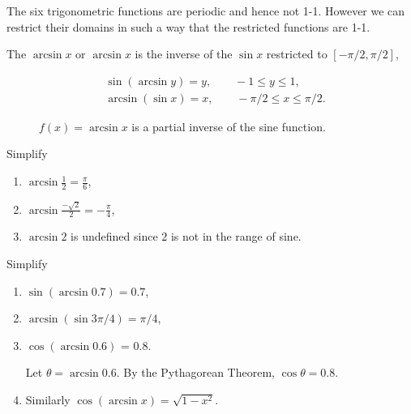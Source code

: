 \documentclass[calc1-main.tex]{subfiles}
\begin{document}
The six trigonometric functions are periodic and hence not 1-1. However we can restrict their domains in such a way that the restricted functions are 1-1.

\begin{minipage}{0.5\textwidth}
  The $\arcsin x$ or $\arcsin x$ is the inverse of the $\sin x$ restricted to $[-\pi/2, \pi/2]$,

  \begin{align*}
    & \sin (\arcsin y) = y, \qquad -1 \le y \le 1, \\
    & \arcsin (\sin x) = x, \qquad -\pi/2 \le x \le \pi/2.
  \end{align*}
\end{minipage}%
\begin{minipage}{0.5\textwidth}
  \begin{figure}[H]
    \centering
    
    \caption{$f(x) = \arcsin x$ is a partial inverse of the sine function.}
  \end{figure}
\end{minipage}

\begin{example}
  Simplify
  \begin{enumerate}
    \item $\arcsin \frac{1}{2} = \frac{\pi}{6}$,

    \item $\arcsin \frac{-\sqrt{2}}{2} = -\frac{\pi}{4}$,

    \item $\arcsin 2$ is undefined since $2$ is not in the range of sine.
  \end{enumerate}
\end{example}

\begin{example}
  Simplify
  \begin{enumerate}
    \item $\sin(\arcsin 0.7) = 0.7$,

    \item $\arcsin (\sin 3 \pi/4) = \pi/4$,

    \item $\cos (\arcsin 0.6)$ = 0.8.

    \begin{solution}
      Let $\theta=\arcsin 0.6$. By the Pythagorean Theorem, $\cos \theta = 0.8$.
    \end{solution}
    \item Similarly $\cos (\arcsin x) = \sqrt{1-x^2}$.

  \end{enumerate}
\end{example}
\end{document}
